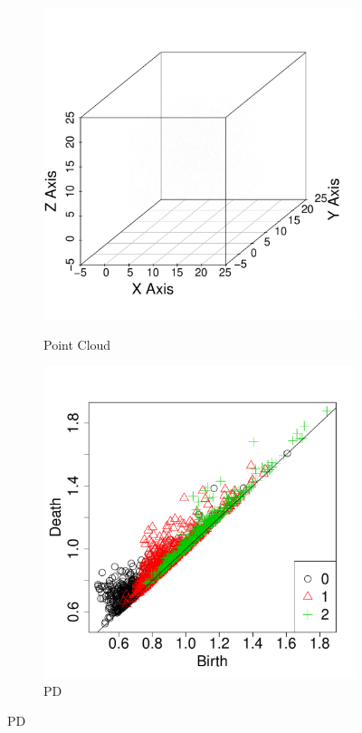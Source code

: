 \documentclass[12pt]{article}
\begin{document}
\begin{figure}[htbp]
   \centering 
  \begin{subfigure}{.24\textwidth}
    \centering
        \caption{Point Cloud}       
        \includegraphics[width=\linewidth]{figure_5_plot.pdf}
    \label{fig:examplestest1}
  \end{subfigure}
    \begin{subfigure}{.24\textwidth}
    \centering
        \caption{PD}  
        \includegraphics[width=\linewidth]{figure_5_pd.pdf}

\end{subfigure}
\end{figure}
\end{document}

